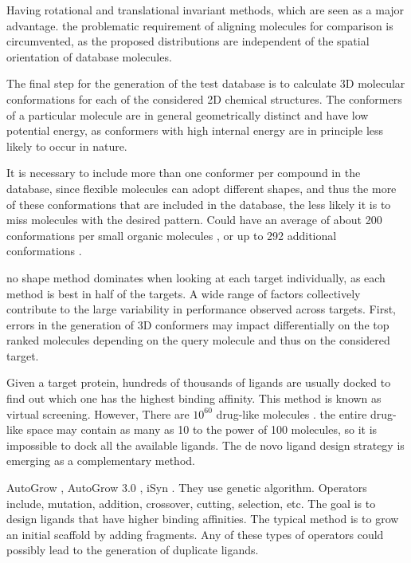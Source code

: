 \documentclass[twocolumn]{svjour3}          %
\begin{document}
Having rotational and translational invariant methods, which are seen as a major advantage. the problematic requirement of aligning molecules for comparison is circumvented, as the proposed distributions are independent of the spatial orientation of database molecules.

The final step for the generation of the test database is to calculate 3D molecular conformations for each of the considered 2D chemical structures. The conformers of a particular molecule are in general geometrically distinct and have low potential energy, as conformers with high internal energy are in principle less likely to occur in nature.

It is necessary to include more than one conformer per compound in the database, since flexible molecules can adopt different shapes, and thus the more of these conformations that are included in the database, the less likely it is to miss molecules with the desired pattern. Could have an average of about 200 conformations per small organic molecules \cite{1332}, or up to 292 additional conformations \cite{1280}.

\cite{1332} no shape method dominates when looking at each target individually, as each method is best in half of the targets. A wide range of factors collectively contribute to the large variability in performance observed across targets. First, errors in the generation of 3D conformers may impact differentially on the top ranked molecules depending on the query molecule and thus on the considered target.


Given a target protein, hundreds of thousands of ligands are usually docked to find out which one has the highest binding affinity. This method is known as virtual screening. However, There are $10^{60}$ drug-like molecules \cite{1104}. the entire drug-like space may contain as many as 10 to the power of 100 molecules, so it is impossible to dock all the available ligands. The de novo ligand design strategy is emerging as a complementary method.

AutoGrow \cite{466}, AutoGrow 3.0 \cite{1354}, iSyn \cite{1381,1387}. They use genetic algorithm. Operators include, mutation, addition, crossover, cutting, selection, etc. The goal is to design ligands that have higher binding affinities. The typical method is to grow an initial scaffold by adding fragments. Any of these types of operators could possibly lead to the generation of duplicate ligands.
\end{document}
